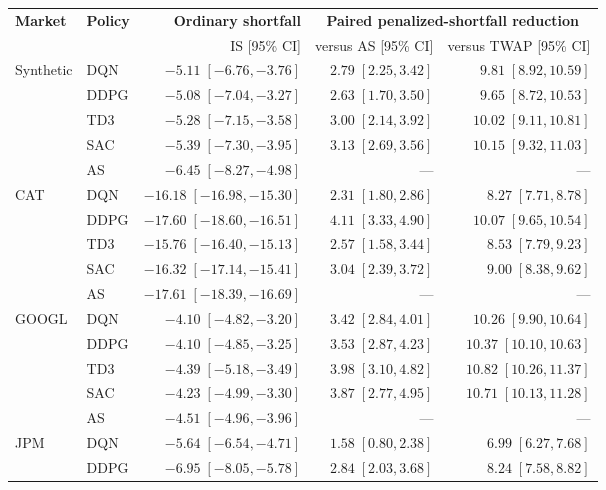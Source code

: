 \begin{table}[!htbp]
\centering\small
\setlength{\tabcolsep}{5pt}
\renewcommand{\arraystretch}{1.08}
\begin{tabular}{@{}llrrr@{}}
\toprule
\textbf{Market} & \textbf{Policy} & \textbf{Ordinary shortfall} & \multicolumn{2}{c}{\textbf{Paired penalized-shortfall reduction}} \\
\cmidrule(l){4-5}
 & & $\mathrm{IS}$ [95\% CI] & versus AS [95\% CI] & versus TWAP [95\% CI] \\
\midrule
Synthetic & DQN & $-5.11\;[-6.76,-3.76]$ & $2.79\;[2.25,3.42]$ & $9.81\;[8.92,10.59]$ \\
 & DDPG & $-5.08\;[-7.04,-3.27]$ & $2.63\;[1.70,3.50]$ & $9.65\;[8.72,10.53]$ \\
 & TD3 & $-5.28\;[-7.15,-3.58]$ & $3.00\;[2.14,3.92]$ & $10.02\;[9.11,10.81]$ \\
 & SAC & $-5.39\;[-7.30,-3.95]$ & $3.13\;[2.69,3.56]$ & $10.15\;[9.32,11.03]$ \\
 & AS & $-6.45\;[-8.27,-4.98]$ & --- & --- \\
\addlinespace[5pt]
CAT & DQN & $-16.18\;[-16.98,-15.30]$ & $2.31\;[1.80,2.86]$ & $8.27\;[7.71,8.78]$ \\
 & DDPG & $-17.60\;[-18.60,-16.51]$ & $4.11\;[3.33,4.90]$ & $10.07\;[9.65,10.54]$ \\
 & TD3 & $-15.76\;[-16.40,-15.13]$ & $2.57\;[1.58,3.44]$ & $8.53\;[7.79,9.23]$ \\
 & SAC & $-16.32\;[-17.14,-15.41]$ & $3.04\;[2.39,3.72]$ & $9.00\;[8.38,9.62]$ \\
 & AS & $-17.61\;[-18.39,-16.69]$ & --- & --- \\
\addlinespace[5pt]
GOOGL & DQN & $-4.10\;[-4.82,-3.20]$ & $3.42\;[2.84,4.01]$ & $10.26\;[9.90,10.64]$ \\
 & DDPG & $-4.10\;[-4.85,-3.25]$ & $3.53\;[2.87,4.23]$ & $10.37\;[10.10,10.63]$ \\
 & TD3 & $-4.39\;[-5.18,-3.49]$ & $3.98\;[3.10,4.82]$ & $10.82\;[10.26,11.37]$ \\
 & SAC & $-4.23\;[-4.99,-3.30]$ & $3.87\;[2.77,4.95]$ & $10.71\;[10.13,11.28]$ \\
 & AS & $-4.51\;[-4.96,-3.96]$ & --- & --- \\
\addlinespace[5pt]
JPM & DQN & $-5.64\;[-6.54,-4.71]$ & $1.58\;[0.80,2.38]$ & $6.99\;[6.27,7.68]$ \\
 & DDPG & $-6.95\;[-8.05,-5.78]$ & $2.84\;[2.03,3.68]$ & $8.24\;[7.58,8.82]$ \\

\end{tabular}
\end{table}
